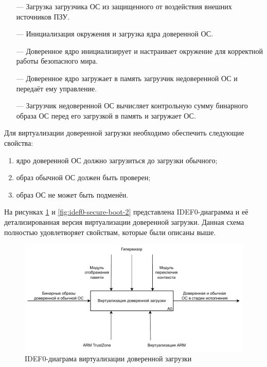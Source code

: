 \begin{itemize}
	\item [---] Загрузка загрузчика ОС из защищенного от воздействия внешних источников ПЗУ.
	\item [---] Инициализация окружения и загрузка ядра доверенной ОС.
	\item [---] Доверенное ядро инициализирует и настраивает окружение для корректной работы безопасного мира.
	\item [---] Доверенное ядро загружает в память загрузчик недоверенной ОС и передаёт ему управление.
	\item [---] Загрузчик недоверенной ОС вычисляет контрольную сумму бинарного образа ОС перед его загрузкой в память и загружает ОС.
\end{itemize}

Для виртуализации доверенной загрузки необходимо обеспечить следующие свойства:

\begin{enumerate}
	\item ядро доверенной ОС должно загрузиться до загрузки обычного;
	\item образ обычной ОС должен быть проверен;
	\item образ ОС не может быть подменён.
\end{enumerate}

На рисунках \ref{fig:idef0-secure-boot-1} и \ref{fig:idef0-secure-boot-2} представлена IDEF0-диаграмма и её детализированная версия виртуализации доверенной загрузки. Данная схема полностью удовлетворяет свойствам, которые были описаны выше.

\begin{figure}[h]
	\centering
	\includegraphics[width=\textwidth]{img/idef0-secure-boot-1.pdf}
	\caption{IDEF0-диаграма виртуализации доверенной загрузки}
	\label{fig:idef0-secure-boot-1}
\end{figure}

